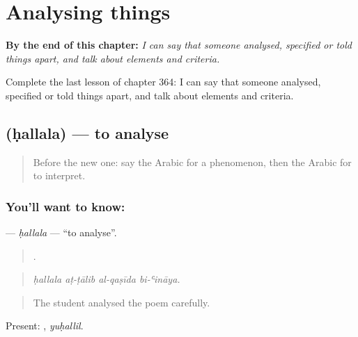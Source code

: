 
\chapter{Analysing things}
\label{ch:ar-analysing-things}

\begin{chapteropening}
\textbf{By the end of this chapter:} \emph{I can say that someone analysed, specified or told things apart, and talk about elements and criteria.}

Complete the last lesson of chapter 364: I can say that someone analysed, specified or told things apart, and talk about elements and criteria.
\end{chapteropening}

\section[\texorpdfstring{\ar{حلل} (ḥallala)}{حلل (ḥallala)}]{ (ḥallala) — to analyse}

\label{lesson:AR-C364-hallala}



\begin{quote}
Before the new one: say the Arabic for a phenomenon, then the Arabic for to interpret.
\end{quote}

\subsection*{You'll want to know: }
\textbf{} — \emph{ḥallala} — \textquotedblleft{}to analyse\textquotedblright{}.

\begin{quote}
   .
\end{quote}

\begin{quote}
\emph{ḥallala aṭ-ṭālib al-qaṣīda bi-ʿināya.}
\end{quote}

\begin{quote}
The student analysed the poem carefully.
\end{quote}

Present: , \emph{yuḥallil}.

